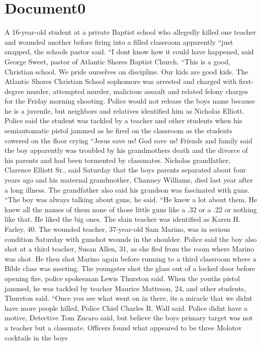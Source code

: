 \documentclass{article}
\begin{document}
\color[rgb]{0,0,0}\section{Document0}
\color[rgb]{0.9921568627450981,0.6549019607843137,0.5882352941176471}A 16-year-old student at a private Baptist school who allegedly killed one teacher and wounded another before firing into a filled classroom apparently ``just snapped, the \color[rgb]{0.6431372549019608,0.2784313725490196,0.35294117647058826}schools \color[rgb]{0.9921568627450981,0.6549019607843137,0.5882352941176471}pastor said. ``I dont know how it could have happened, said George Sweet, pastor of Atlantic Shores Baptist Church. ``This is a good, Christian school. We pride ourselves on discipline. Our kids are good kids. The Atlantic Shores Christian School sophomore was arrested and charged with first-degree murder, attempted murder, malicious assault and related felony charges for the Friday morning shooting. Police would not release the boys name because he is a juvenile, but neighbors and relatives identified him as Nicholas Elliott. Police said the student was tackled by a teacher and other \color[rgb]{0.6431372549019608,0.2784313725490196,0.35294117647058826}students when his semiautomatic \color[rgb]{0.9921568627450981,0.6549019607843137,0.5882352941176471}pistol jammed as he fired on the classroom as the \color[rgb]{0.6431372549019608,0.2784313725490196,0.35294117647058826}students cowered on the \color[rgb]{0.9921568627450981,0.6549019607843137,0.5882352941176471}floor crying ``Jesus save us! God save us! Friends and family said the boy apparently was troubled by his grandmothers death and the divorce of his parents and had been tormented by classmates. Nicholas grandfather, Clarence Elliott Sr., said Saturday that the boys parents separated about four years ago and his maternal grandmother, Channey Williams, died last year after a long illness. The grandfather also said his grandson was fascinated with guns. ``The boy was always talking about guns, he said. ``He knew a lot about them. He knew all the names of them  none of those little guns like a .32 or a .22 or nothing like that. He liked the big ones. The slain teacher was identified as Karen H. Farley, 40. The wounded teacher, 37-year-old Sam Marino, was in serious condition Saturday with gunshot wounds in the shoulder. Police said the boy also shot at a third teacher, Susan Allen, 31, as she fled from the room where Marino was shot. He then shot Marino again before running to a third classroom where a Bible class was meeting. The youngster shot the glass out of a locked door before opening fire, police spokesman Lewis Thurston said. When the youths pistol jammed, he was tackled by teacher Maurice Matteson, 24, and other \color[rgb]{0.6431372549019608,0.2784313725490196,0.35294117647058826}students, Thurston said. \color[rgb]{0.9921568627450981,0.6549019607843137,0.5882352941176471}``Once you see what went on in there, its a miracle that we didnt have more people killed, Police Chief Charles R. Wall said. Police didnt have a motive, Detective Tom Zucaro said, but believe the boys primary target was not a teacher but a classmate. Officers found what appeared to be three Molotov cocktails in the boys 
\end{document}
